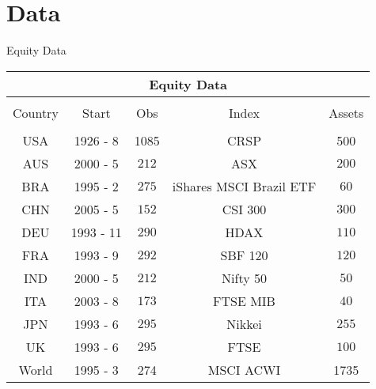 \documentclass[handout]{beamer}
\begin{document}
\section{Data}
\begin{frame}{Equity Data}
		\begin{adjustbox}{width=\textwidth}
	\begin{tabular}{ccccc}
		\multicolumn{5}{c}{Equity Data}\\
		\hline \hline \\[-1.8ex] 
		Country & Start & Obs & Index & Assets\\
		\hline\\[-1.8ex]
		USA & 1926 - 8 & 1085 & CRSP & 500\\
		AUS & 2000 - 5 & $212$& ASX & $200$ \\ 
		BRA & 1995 - 2 & $275$& iShares MSCI Brazil ETF& $60$ \\ 
		CHN & 2005 - 5 & $152$& CSI 300& $300$ \\ 
		DEU & 1993 - 11 & $290$& HDAX& $110$ \\
		FRA & 1993 - 9 & $292$& SBF 120& $120$ \\ 
		IND & 2000 - 5 & $212$& Nifty 50& $50$ \\ 
		ITA & 2003 - 8 & $173$& FTSE MIB& $40$ \\ 
		JPN & 1993 - 6 & $295$& Nikkei& $255$ \\ 
		UK & 1993 - 6 & $295$& FTSE& $100$ \\ 
		World & 1995 - 3 & 274 & MSCI ACWI & 1735\\
		\hline
	\end{tabular}
		\end{adjustbox}
\end{frame}
\end{document}

